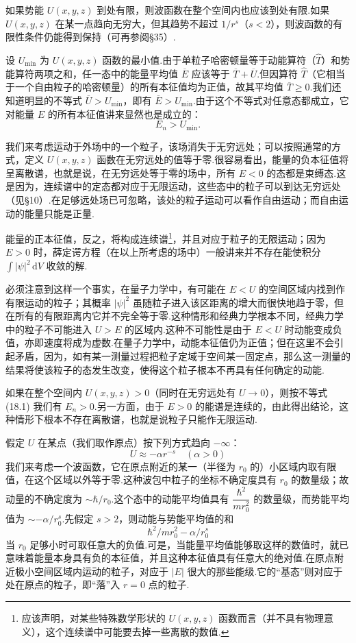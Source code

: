 如果势能 $U(x,y,z)$ 到处有限，则波函数在整个空间内也应该到处有限.如果 $U(x,y,z)$ 在某一点趋向无穷大，但其趋势不超过 $1/r^s$（$s<2$），则波函数的有限性条件仍能得到保持（可再参阅§35）.

设 $U_{\min}$ 为 $U(x,y,z)$ 函数的最小值.由于单粒子哈密顿量等于动能算符（$\hat{T}$）和势能算符两项之和，任一态中的能量平均值 $\overline{E}$ 应该等于 $\overline{T}+\overline{U}$.但因算符 $\hat{T}$（它相当于一个自由粒子的哈密顿量）的所有本征值均为正值，故其平均值 $\overline{T}\geq 0$.我们还知道明显的不等式 $\overline{U}>U_{\min}$，即有 $\overline{E}>U_{\min}$.由于这个不等式对任意态都成立，它对能量 $E$ 的所有本征值讲来显然也是成立的：
\begin{equation}
  E_n>U_{\min}.
\end{equation}

我们来考虑运动于外场中的一个粒子，该场消失于无穷远处；可以按照通常的方式，定义 $U(x,y,z)$ 函数在无穷远处的值等于零.很容易看出，能量的负本征值将呈离散谱，也就是说，在无穷远处等于零的场中，所有 $E<0$ 的态都是束缚态.这是因为，连续谱中的定态都对应于无限运动，这些态中的粒子可以到达无穷远处（见§10）.在足够远处场已可忽略，该处的粒子运动可以看作自由运动；而自由运动的能量只能是正量.

能量的正本征值，反之，将构成连续谱\footnote{应该声明，对某些特殊数学形状的 $U(x,y,z)$ 函数而言（并不具有物理意义），这个连续谱中可能要去掉一些离散的数值.}，并且对应于粒子的无限运动；因为 $E>0$ 时，薛定谔方程（在以上所考虑的场中）一般讲来并不存在能使积分 $\int|\psi|^2\,\mathrm{d}V$ 收敛的解.

必须注意到这样一个事实，在量子力学中，有可能在 $E<U$ 的空间区域内找到作有限运动的粒子；其概率 $|\psi|^2$ 虽随粒子进入该区距离的增大而很快地趋于零，但在所有的有限距离内它并不完全等于零.这种情形和经典力学根本不同，经典力学中的粒子不可能进入 $U>E$ 的区域内.这种不可能性是由于 $E<U$ 时动能变成负值，亦即速度将成为虚数.在量子力学中，动能本征值仍为正值；但在这里不会引起矛盾，因为，如有某一测量过程把粒子定域于空间某一固定点，那么这一测量的结果将使该粒子的态发生改变，使得这个粒子根本不再具有任何确定的动能.

如果在整个空间内 $U(x,y,z)>0$（同时在无穷远处有 $U\to 0$），则按不等式 (18.1) 我们有 $E_n>0$.另一方面，由于 $E>0$ 的能谱是连续的，由此得出结论，这种情形下根本不存在离散谱，也就是说粒子只能作无限运动.

假定 $U$ 在某点（我们取作原点）按下列方式趋向 $-\infty$：
\begin{equation}
  U\approx-\alpha r^{-s}\quad(\alpha>0)
\end{equation}
我们来考虑一个波函数，它在原点附近的某一（半径为 $r_0$ 的）小区域内取有限值，在这个区域以外等于零.这种波包中粒子的坐标不确定度具有 $r_0$ 的数量级；故动量的不确定度为 $\sim\hbar/r_0$.这个态中的动能平均值具有 $\dfrac{\hbar^2}{mr_0^2}$ 的数量级，而势能平均值为 $\sim-\alpha/r_0^s$.先假定 $s>2$，则动能与势能平均值的和
\begin{equation*}
  \hbar^2/mr_0^2-\alpha/r_0^s
\end{equation*}
当 $r_0$ 足够小时可取任意大的负值.可是，当能量平均值能够取这样的数值时，就已意味着能量本身具有负的本征值，并且这种本征值具有任意大的绝对值.在原点附近极小空间区域内运动的粒子，对应于 $|E|$ 很大的那些能级.它的“基态”则对应于处在原点的粒子，即“落”入 $r=0$ 点的粒子.

